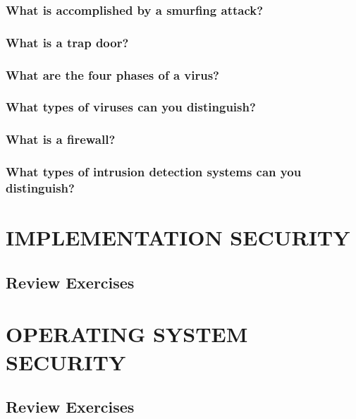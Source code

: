 \documentclass[a4paper, 10 pt, conference]{ieeeconf}
\begin{document}
\subsubsection{\textbf{What is accomplished by a smurfing attack?}}

\subsubsection{\textbf{What is a trap door?}}

\subsubsection{\textbf{What are the four phases of a virus?}}

\subsubsection{\textbf{What types of viruses can you distinguish?}}

\subsubsection{\textbf{What is a firewall?}}

\subsubsection{\textbf{What types of intrusion detection systems can you distinguish?}}






\section{\textbf{IMPLEMENTATION SECURITY}}
\subsection{\textbf{Review Exercises}}






\section{\textbf{OPERATING SYSTEM SECURITY}}
\subsection{\textbf{Review Exercises}}
\end{document}
